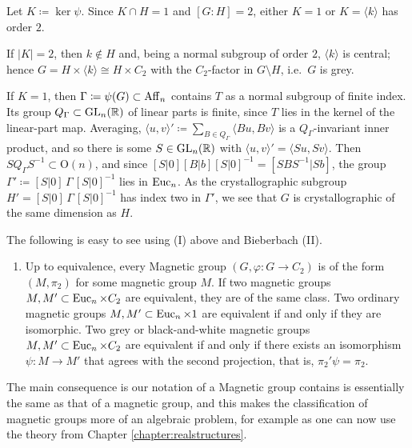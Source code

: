 \begin{just}
Let $K\coloneqq\ker\psi$. Since $K\cap H=1$ and $[G:H]=2$, either $K=1$ or $K=\langle k\rangle$ has order $2$.

If $|K|=2$, then $k\notin H$ and, being a normal subgroup of order $2$, $\langle k\rangle$ is central; hence
$G=H\times\langle k\rangle\cong H\times C_2$ with the $C_2$-factor in $G\setminus H$, i.e.\ $G$ is grey.

If $K=1$, then $\Gamma\coloneqq\psi(G)\subset\operatorname{Aff}_n$ contains $T$ as a normal subgroup of finite index.
Its group $Q_\Gamma\subset\operatorname{GL}_n({\mathbb R})$ of linear parts is finite, since $T$ lies in the kernel of the linear-part map.
Averaging, $\langle u,v\rangle'\coloneqq\sum_{B\in Q_\Gamma}\langle Bu,Bv\rangle$ is a $Q_\Gamma$-invariant inner product, and so there is some $S\in\operatorname{GL}_n({\mathbb R})$ with $\langle u,v\rangle'=\langle Su,Sv\rangle$. Then $SQ_\Gamma S^{-1}\subset\mathrm{O}(n)$, and since $[S|0][B|b][S|0]^{-1}=[SBS^{-1}|Sb]$, the group $\Gamma' \coloneqq [S|0]\,\Gamma\,[S|0]^{-1}$ lies in $\operatorname{Euc}_n$. As the crystallographic subgroup $H' = [S|0]\,\Gamma\,[S|0]^{-1}$ has index two in $\Gamma'$, we see that $G$ is crystallographic of the same dimension as $H$.
\end{just} 

The following is easy to see using (I) above and Bieberbach (II).

\begin{enumerate}[resume, label=\textnormal{(\Roman*)}]
\item
  Up to equivalence, every Magnetic group $(G, \varphi \colon G \rightarrow C_2)$ is of the form $(M, \pi_2)$ for some magnetic group $M$.
  If two magnetic groups $M, M' \subset \operatorname{Euc}_n \times C_2$ are equivalent, they are of the same class.
  Two ordinary magnetic groups $M, M' \subset \operatorname{Euc}_n \times 1$ are equivalent
  if and only if they are isomorphic.
Two grey or black-and-white magnetic groups $M, M' \subset \operatorname{Euc}_n \times C_2$ are equivalent
if and only if there exists an isomorphism $\psi: M \to M'$ that agrees with the second projection, that is,
$\pi_2' \psi = \pi_2$.
\end{enumerate}

The main consequence is our notation of a Magnetic group contains is essentially the same as that of a magnetic group, and this makes the classification of magnetic groups more of an algebraic problem, for example as one can now use the theory from Chapter \ref{chapter:realstructures}.

